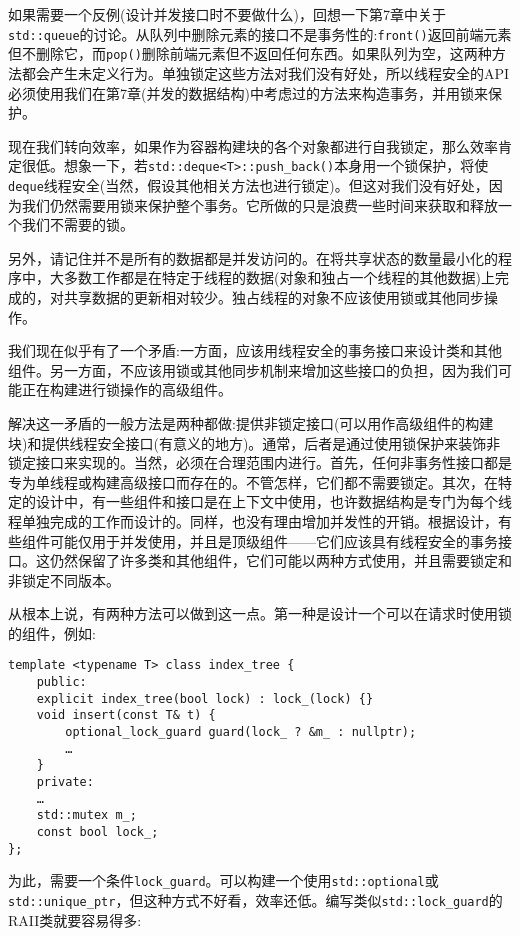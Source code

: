 如果需要一个反例(设计并发接口时不要做什么)，回想一下第7章中关于\texttt{std::queue}的讨论。从队列中删除元素的接口不是事务性的:\texttt{front()}返回前端元素但不删除它，而\texttt{pop()}删除前端元素但不返回任何东西。如果队列为空，这两种方法都会产生未定义行为。单独锁定这些方法对我们没有好处，所以线程安全的API必须使用我们在第7章(并发的数据结构)中考虑过的方法来构造事务，并用锁来保护。

现在我们转向效率，如果作为容器构建块的各个对象都进行自我锁定，那么效率肯定很低。想象一下，若\texttt{std::deque<T>::push\_back()}本身用一个锁保护，将使\texttt{deque}线程安全(当然，假设其他相关方法也进行锁定)。但这对我们没有好处，因为我们仍然需要用锁来保护整个事务。它所做的只是浪费一些时间来获取和释放一个我们不需要的锁。

另外，请记住并不是所有的数据都是并发访问的。在将共享状态的数量最小化的程序中，大多数工作都是在特定于线程的数据(对象和独占一个线程的其他数据)上完成的，对共享数据的更新相对较少。独占线程的对象不应该使用锁或其他同步操作。

我们现在似乎有了一个矛盾:一方面，应该用线程安全的事务接口来设计类和其他组件。另一方面，不应该用锁或其他同步机制来增加这些接口的负担，因为我们可能正在构建进行锁操作的高级组件。 

解决这一矛盾的一般方法是两种都做:提供非锁定接口(可以用作高级组件的构建块)和提供线程安全接口(有意义的地方)。通常，后者是通过使用锁保护来装饰非锁定接口来实现的。当然，必须在合理范围内进行。首先，任何非事务性接口都是专为单线程或构建高级接口而存在的。不管怎样，它们都不需要锁定。其次，在特定的设计中，有一些组件和接口是在上下文中使用，也许数据结构是专门为每个线程单独完成的工作而设计的。同样，也没有理由增加并发性的开销。根据设计，有些组件可能仅用于并发使用，并且是顶级组件——它们应该具有线程安全的事务接口。这仍然保留了许多类和其他组件，它们可能以两种方式使用，并且需要锁定和非锁定不同版本。

从根本上说，有两种方法可以做到这一点。第一种是设计一个可以在请求时使用锁的组件，例如:

\begin{lstlisting}[style=styleCXX]
template <typename T> class index_tree {
	public:
	explicit index_tree(bool lock) : lock_(lock) {}
	void insert(const T& t) {
		optional_lock_guard guard(lock_ ? &m_ : nullptr);
		…
	}
	private:
	…
	std::mutex m_;
	const bool lock_;
};
\end{lstlisting}

为此，需要一个条件\texttt{lock\_guard}。可以构建一个使用\texttt{std::optional}或\texttt{std::unique\_ptr}，但这种方式不好看，效率还低。编写类似\texttt{std::lock\_guard}的RAII类就要容易得多:

